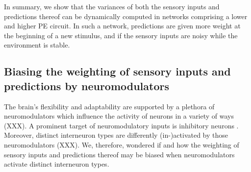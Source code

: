 \documentclass[10pt,a4paper,draft]{article}
\begin{document}
In summary, we show that the variances of both the sensory inputs and predictions thereof can be dynamically computed in networks comprising a lower and higher PE circuit. In such a network, predictions are given more weight at the beginning of a new stimulus, and if the sensory inputs are noisy while the environment is stable. 

\subsection*{Biasing the weighting of sensory inputs and predictions by neuromodulators}
%
The brain's flexibility and adaptability are supported by a plethora of neuromodulators which influence the activity of neurons in a variety of ways (XXX). A prominent target of neuromodulatory inputs is inhibitory neurons \citep{cardin2019functional, XXX}. Moreover, distinct interneuron types are differently (in-)activated by those neuromodulators (XXX). We, therefore, wondered if and how the weighting of sensory inputs and predictions thereof may be biased when neuromodulators activate distinct interneuron types.
%
\end{document}
